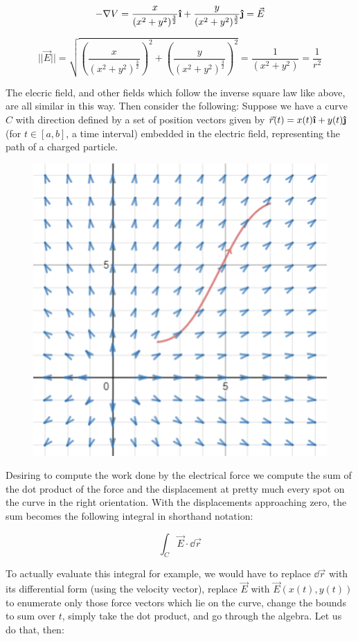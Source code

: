 \documentclass[11pt]{article}
\newcommand{\ihat}{\boldsymbol{\hat{\textbf{\i}}}}
\newcommand{\jhat}{\boldsymbol{\hat{\textbf{\j}}}}
\begin{document}
$$-\nabla V = \frac{x}{(x^2+y^2)^\frac{3}{2}} \ihat + \frac{y}{(x^2+y^2)^\frac{3}{2}} \jhat = \vec{E}$$

$$||\vec{E}|| = \sqrt{\left(\frac{x}{(x^2+y^2)^\frac{3}{2}}\right)^2 + \left(\frac{y}{(x^2+y^2)^\frac{3}{2}}\right)^2} = \frac{1}{(x^2+y^2)} = \frac{1}{r^2}$$

The elecric field, and other fields which follow the inverse square law like above, are all similar in this way. Then consider the following: Suppose we have a curve $C$ with direction defined by a set of position vectors given by $\vec{r}(t) = x(t)\ihat + y(t)\jhat$ (for $t \in [a,b]$, a time interval) embedded in the electric field, representing the path of a charged particle.

\begin{figure}[h]
\centering
\includegraphics[scale=0.75]{curve}
\end{figure}

Desiring to compute the work done by the electrical force we compute the sum of the dot product of the force and the displacement at pretty much every spot on the curve in the right orientation. With the displacements approaching zero, the sum becomes the following integral in shorthand notation:

$$\int_C \vec{E}\cdot\dd{\vec{r}}$$

To actually evaluate this integral for example, we would have to replace $\dd{\vec{r}}$ with its differential form (using the velocity vector), replace $\vec{E}$ with $\vec{E}(x(t),y(t))$ to enumerate only those force vectors which lie on the curve, change the bounds to sum over $t$, simply take the dot product, and go through the algebra. Let us do that, then:
\end{document}

